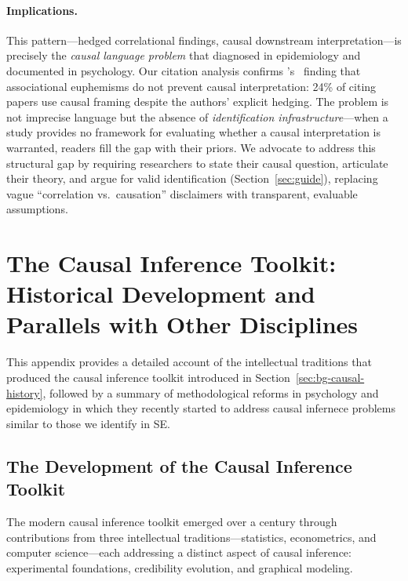 \paragraph{Implications.}
This pattern---hedged correlational findings, causal downstream interpretation---is precisely the \emph{causal language problem} that \citet{hernan2018cword} diagnosed in epidemiology and \citet{grosz2020taboo} documented in psychology.
Our citation analysis confirms \citeauthor{haber2022causal}'s~\cite{haber2022causal} finding that associational euphemisms do not prevent causal interpretation: 24\% of citing papers use causal framing despite the authors' explicit hedging.
The problem is not imprecise language but the absence of \emph{identification infrastructure}---when a study provides no framework for evaluating whether a causal interpretation is warranted, readers fill the gap with their priors.
We advocate to address this structural gap by requiring researchers to state their causal question, articulate their theory, and argue for valid identification (Section~\ref{sec:guide}), replacing vague ``correlation vs.\ causation'' disclaimers with transparent, evaluable assumptions.

\section{The Causal Inference Toolkit: Historical Development and Parallels with Other Disciplines}
\label{sec:appendix-history}

This appendix provides a detailed account of the intellectual traditions that produced the causal inference toolkit introduced in Section~\ref{sec:bg-causal-history}, followed by a summary of methodological reforms in psychology and epidemiology in which they recently started to address causal infernece problems similar to those we identify in SE\@.

\subsection{The Development of the Causal Inference Toolkit}
\label{sec:appendix-toolkit-history}

The modern causal inference toolkit emerged over a century through contributions from three intellectual traditions---statistics, econometrics, and computer science---each addressing a distinct aspect of causal inference: experimental foundations, credibility evolution, and graphical modeling.

